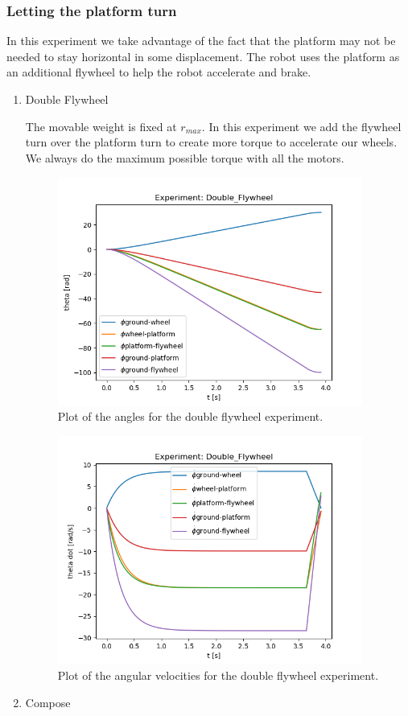 \subsubsection{Letting the platform turn}
In this experiment we take advantage of the fact that the platform may not be needed
to stay horizontal in some displacement. The robot uses the platform as an
additional flywheel to help the robot accelerate and brake.
\begin{enumerate}
	\item Double Flywheel
	
	The movable weight is fixed at $r_{max}$. In this experiment we add the flywheel turn over the platform turn to 
		create more torque to accelerate our wheels. We always do the maximum possible torque with all the motors.
	      \begin{figure}[H]
		      \centering
		      \includegraphics[width=10cm]{img/lagrange_5/double_q.png}
		      \caption{Plot of the angles for the double flywheel experiment.}
		      \label{fig:Simulation double q}
	      \end{figure}


	      \begin{figure}[H]
		      \centering
		      \includegraphics[width=10cm]{img/lagrange_5/double_q_dot.png}
		      \caption{Plot of the angular velocities for the double flywheel experiment.}
		      \label{fig:Simulation double q dot}
	      \end{figure}
	\item Compose
		  

\end{enumerate}

